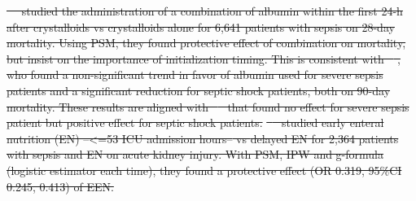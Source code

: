 \documentclass[10pt,letterpaper]{article}
\providecommand{\DIFdeltex}[1]{{\protect\color{red}\sout{#1}}}                      %
\providecommand{\DIFdelend}{} %
\providecommand{\DIFdel}[1]{\texorpdfstring{\DIFdeltex{#1}}{}} %
\DeclareRobustCommand{\DIFdelend}{\DIFOaddend \let\includegraphics\DIFOincludegraphics} %
\begin{document}
\DIFdel{\mbox{%
\cite{zhou2021early} }\hskip0pt%
studied the administration of \textcolor{I}{a
          combination of albumin within the first 24-h after crystalloids} vs
        \textcolor{C}{crystalloids alone} for \textcolor{P}{6,641 patients
          with sepsis} on \textcolor{O}{28-day mortality}. Using PSM, they found
        protective effect of combination on mortality, but insist on the
        importance of initialization timing. This is consistent with \mbox{%
\cite{xu2014comparison}}\hskip0pt%
, who
        found a non-significant trend
        in favor of albumin used for severe sepsis patients and a significant
        reduction for septic shock patients, both on 90-day mortality. These
        results are aligned with \mbox{%
\cite{caironi2014albumin} }\hskip0pt%
that found no effect
        for severe sepsis patient but positive effect for septic shock patients.
  }%
\DIFdel{\mbox{%
\cite{wang2023early} }\hskip0pt%
studied \textcolor{I}{early enteral nutrition (EN)
          --<=53 ICU admission hours--} vs \textcolor{C}{delayed EN} for
        \textcolor{P}{2,364 patients with sepsis and EN} on
        \textcolor{O}{acute kidney injury}. With PSM, IPW and g-formula
        (logistic estimator each time), they found a protective effect
        (OR 0.319, 95\%CI 0.245, 0.413) of EEN.
}%
\DIFdelend %
\end{document}
